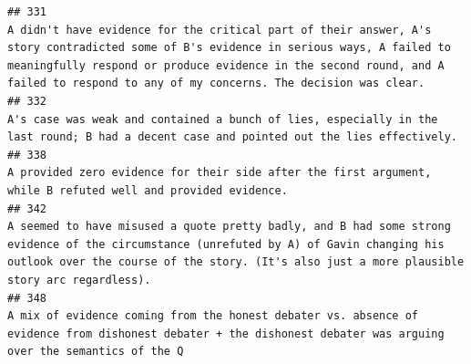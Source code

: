 \documentclass[
]{article}
\begin{document}
\begin{verbatim}
## 331                                                                                                                                                                                                                                                                                                                        A didn't have evidence for the critical part of their answer, A's story contradicted some of B's evidence in serious ways, A failed to meaningfully respond or produce evidence in the second round, and A failed to respond to any of my concerns. The decision was clear.
## 332                                                                                                                                                                                                                                                                                                                                                                                                                                                           A's case was weak and contained a bunch of lies, especially in the last round; B had a decent case and pointed out the lies effectively.
## 338                                                                                                                                                                                                                                                                                                                                                                                                                                                                                      A provided zero evidence for their side after the first argument, while B refuted well and provided evidence.
## 342                                                                                                                                                                                                                                                                                                                                                             A seemed to have misused a quote pretty badly, and B had some strong evidence of the circumstance (unrefuted by A) of Gavin changing his outlook over the course of the story. (It's also just a more plausible story arc regardless).
## 348                                                                                                                                                                                                                                                                                                                                                                                                                                    A mix of evidence coming from the honest debater vs. absence of evidence from dishonest debater + the dishonest debater was arguing over the semantics of the Q

\end{verbatim}
\end{document}
